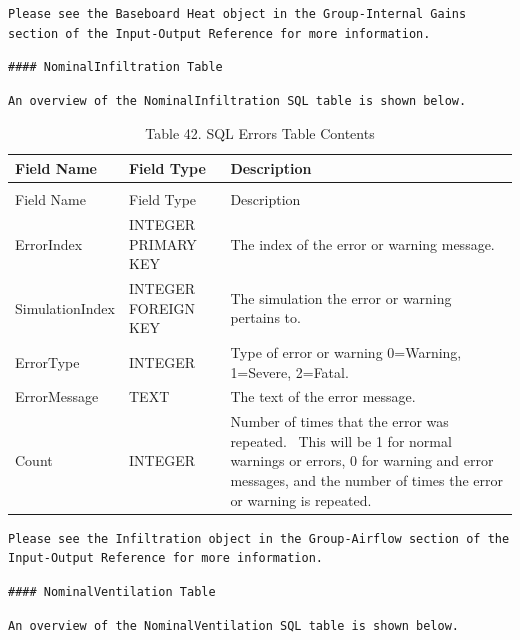 \begin{lstlisting}
Please see the Baseboard Heat object in the Group-Internal Gains section of the Input-Output Reference for more information.
\end{lstlisting}

\begin{lstlisting}
#### NominalInfiltration Table
\end{lstlisting}

\begin{lstlisting}
An overview of the NominalInfiltration SQL table is shown below.
\end{lstlisting}

\begin{longtable}[c]{p{1.5in}p{1.5in}p{2.99in}}
\caption{Table 42. SQL Errors Table Contents \label{table:table-42.-sql-errors-table-contents}} \tabularnewline
\toprule 
Field Name & Field Type & Description \tabularnewline
\midrule
\endfirsthead

\caption[]{Table 42. SQL Errors Table Contents} \tabularnewline
\toprule 
Field Name & Field Type & Description \tabularnewline
\midrule
\endhead

ErrorIndex & INTEGER PRIMARY KEY & The index of the error or warning message. \tabularnewline
SimulationIndex & INTEGER FOREIGN KEY & The simulation the error or warning pertains to. \tabularnewline
ErrorType & INTEGER & Type of error or warning 0=Warning, 1=Severe, 2=Fatal. \tabularnewline
ErrorMessage & TEXT & The text of the error message. \tabularnewline
Count & INTEGER & Number of times that the error was repeated.~ This will be 1 for normal warnings or errors, 0 for warning and error messages, and the number of times the error or warning is repeated. \tabularnewline
\bottomrule
\end{longtable}

\begin{lstlisting}
Please see the Infiltration object in the Group-Airflow section of the Input-Output Reference for more information.
\end{lstlisting}

\begin{lstlisting}
#### NominalVentilation Table
\end{lstlisting}

\begin{lstlisting}
An overview of the NominalVentilation SQL table is shown below.
\end{lstlisting}

